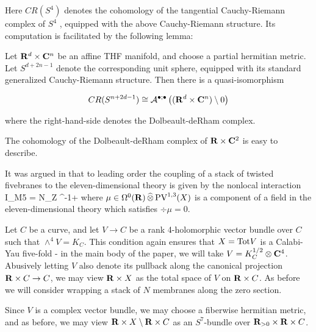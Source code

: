 Here $CR (S^{4})$ denotes the cohomology of the tangential Cauchy-Riemann complex of $S^{4}$ , equipped with the above Cauchy-Riemann structure. Its computation is facilitated by the following lemma:

\begin{lem}
  Let $\mathbf{R}^{d}\times \mathbf{C}^{n}$ be an affine THF manifold, and choose a partial hermitian metric. Let $S^{d+2n-1}$ denote the corresponding unit sphere, equipped with its standard generalized Cauchy-Riemann structure. Then there is a quasi-isomorphism

  \[CR (S^{n+2d-1})\cong \mathcal A^{\bullet;\bullet}\left ( (\mathbf{R}^{d}\times \mathbf{C}^{n})\setminus 0 \right )\]

  where the right-hand-side denotes the Dolbeault-deRham complex.
\end{lem}

The cohomology of the Dolbeault-deRham complex of $\mathbf{R}\times \mathbf{C}^{2}$ is easy to describe.


It was argued in \cite{RSW} that to leading order the coupling of a stack of twisted fivebranes to the eleven-dimensional theory is given by the nonlocal interaction 
\beqn\label{eqn:br1}
I_{M5} = N\int_{Z} \div^{-1}\mu \vee \Omega +\cdots 
\eeqn
where $\mu \in \Omega^0 (\mathbf{R}) \, \widehat{\otimes} \, {\rm PV}^{1,3}(X)$ is a component of a field in the eleven-dimensional theory which satisfies $\div \mu = 0$.

\parsec
Let $C$ be a curve, and let $V\to C$ be a rank 4-holomorphic vector bundle over $C$ such that $\wedge^{4} V = K_{C}$. This condition again ensures that $X = {\rm Tot} V$ is a Calabi-Yau five-fold - in the main body of the paper, we will take $V = K^{1/2}_{C}\otimes \mathbf{C}^{4}$. Abusively letting $V$ also denote its pullback along the canonical projection $\mathbf{R}\times C \to C$, we may view $\mathbf{R}\times X$ as the total space of $V$ on $\mathbf{R}\times C$. As before we will consider wrapping a stack of $N$ membranes along the zero section.

Since $V$ is a complex vector bundle, we may choose a fiberwise hermitian metric, and as before, we may view $\mathbf{R}\times X \setminus \mathbf{R}\times C$ as an $S^{7}$-bundle over $\mathbf{R}_{>0}\times \mathbf{R}\times C$.




